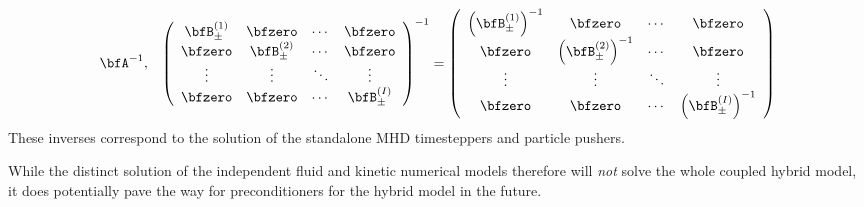     \begin{align}
        \bfA^{- 1},  &&
        \left(\begin{array}{ c c c c }
            \bfB_{\pm}^{(1)}  &  \bfzero           &  \cdots  &  \bfzero           \\
            \bfzero           &  \bfB_{\pm}^{(2)}  &  \cdots  &  \bfzero           \\
            \vdots            &  \vdots            &  \ddots  &  \vdots            \\
            \bfzero           &  \bfzero           &  \cdots  &  \bfB_{\pm}^{(I)}  \\
        \end{array}\right)^{- 1}  =  \left(\begin{array}{ c c c c }
            \left(\bfB_{\pm}^{(1)}\right)^{- 1}  &  \bfzero                              &  \cdots  &  \bfzero                              \\
            \bfzero                              &  \left(\bfB_{\pm}^{(2)}\right)^{- 1}  &  \cdots  &  \bfzero                              \\
            \vdots                               &  \vdots                               &  \ddots  &  \vdots                               \\
            \bfzero                              &  \bfzero                              &  \cdots  &  \left(\bfB_{\pm}^{(I)}\right)^{- 1}  \\
        \end{array}\right)
    \end{align}
    These inverses correspond to the solution of the standalone MHD timesteppers and particle pushers.

    While the distinct solution of the independent fluid and kinetic numerical models therefore will \emph{not} solve the whole coupled hybrid model, it does potentially pave the way for preconditioners for the hybrid model in the future.
